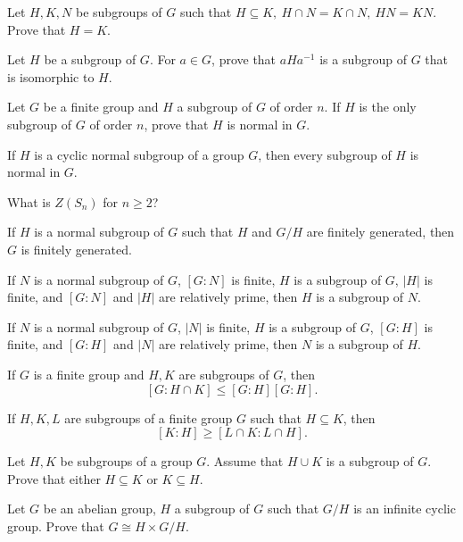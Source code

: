 \documentclass[addpoints,10pt]{exam}
\theoremstyle{plain}
\theoremstyle{definition}
\newtheorem{prob}[thm]{Problem}
\theoremstyle{plain}
\theoremstyle{plain}
\theoremstyle{definition}
\let\oldprob\prob
\let\endoldprob\endprob
\renewenvironment{prob}
  {\begin{singlespace}\oldprob}
  {\endoldprob\end{singlespace}}
\begin{document}
\begin{prob}
Let $H,K,N$ be subgroups of $G$ such that $H\subseteq K,\ H\cap N=K\cap N,\ HN=KN$. Prove that $H=K$.
\end{prob}

\begin{prob}
Let $H$ be a subgroup of $G$. For $a\in G$, prove that $aHa^{-1}$ is a subgroup of $G$ that is isomorphic to $H$.
\end{prob}

\begin{prob}
Let $G$ be a finite group and $H$ a subgroup of $G$ of order $n$. If $H$ is the only subgroup of $G$ of order $n$, prove that $H$ is normal in $G$.
\end{prob}

\begin{prob}
If $H$ is a cyclic normal subgroup of a group $G$, then every subgroup of $H$ is normal in $G$.
\end{prob}

\begin{prob}
What is $Z(S_n)$ for $n \ge 2$?
\end{prob}

\begin{prob}
If $H$ is a normal subgroup of $G$ such that $H$ and $G/H$ are finitely generated, then $G$ is finitely generated.
\end{prob}

\begin{prob}
If $N$ is a normal subgroup of $G$, $[G:N]$ is finite, $H$ is a subgroup of $G$, $|H|$ is finite, and $[G:N]$ and $|H|$ are relatively prime, then $H$ is a subgroup of $N$.
\end{prob}

\begin{prob}
If $N$ is a normal subgroup of $G$, $|N|$ is finite, $H$ is a subgroup of $G$, $[G:H]$ is finite, and $[G:H]$ and $|N|$ are relatively prime, then $N$ is a subgroup of $H$.
\end{prob}

\begin{prob}
If $G$ is a finite group and $H,K$ are subgroups of $G$, then
\[
[G:H\cap K] \le [G:H][G:H].
\]
\end{prob}

\begin{prob}
If $H,K,L$ are subgroups of a finite group $G$ such that $H\subseteq K$, then
\[
[K:H] \ge [L\cap K : L\cap H].
\]
\end{prob}

\begin{prob}
Let $H,K$ be subgroups of a group $G$. Assume that $H\cup K$ is a subgroup of $G$. Prove that either $H\subseteq K$ or $K\subseteq H$.
\end{prob}

\begin{prob}
Let $G$ be an abelian group, $H$ a subgroup of $G$ such that $G/H$ is an infinite cyclic group. Prove that $G \cong H \times G/H$.
\end{prob}
\end{document}
